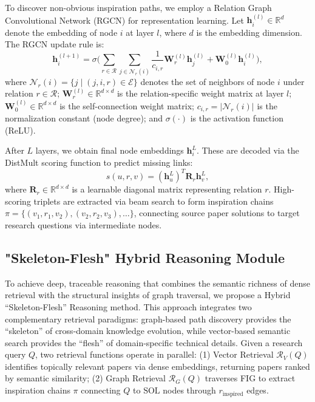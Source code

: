 \documentclass[runningheads]{llncs}
\begin{document}
To discover non-obvious inspiration paths, we employ a Relation Graph Convolutional Network (RGCN) for representation learning. Let $\mathbf{h}_i^{(l)} \in \mathbb{R}^d$ denote the embedding of node $i$ at layer $l$, where $d$ is the embedding dimension. The RGCN update rule is:
\begin{equation}
    \mathbf{h}_i^{(l+1)} = \sigma \Bigg( \sum_{r \in \mathcal{R}} \sum_{j \in \mathcal{N}_r(i)} \frac{1}{c_{i,r}} \mathbf{W}_r^{(l)} \mathbf{h}_j^{(l)} + \mathbf{W}_0^{(l)} \mathbf{h}_i^{(l)} \Bigg),
\end{equation}
where $\mathcal{N}_r(i) = \{j \mid (j, i, r) \in \mathcal{E}\}$ denotes the set of neighbors of node $i$ under relation $r \in \mathcal{R}$; $\mathbf{W}_r^{(l)} \in \mathbb{R}^{d \times d}$ is the relation-specific weight matrix at layer $l$; $\mathbf{W}_0^{(l)} \in \mathbb{R}^{d \times d}$ is the self-connection weight matrix; $c_{i,r} = |\mathcal{N}_r(i)|$ is the normalization constant (node degree); and $\sigma(\cdot)$ is the activation function (ReLU).

After $L$ layers, we obtain final node embeddings $\mathbf{h}_i^L$. These are decoded via the DistMult scoring function to predict missing links:
\begin{equation}
    s(u, r, v) = (\mathbf{h}_u^L)^T \mathbf{R}_r \mathbf{h}_v^L,
\end{equation}
where $\mathbf{R}_r \in \mathbb{R}^{d \times d}$ is a learnable diagonal matrix representing relation $r$. High-scoring triplets are extracted via beam search to form inspiration chains $\pi = \{(v_1, r_1, v_2), (v_2, r_2, v_3), \ldots\}$, connecting source paper solutions to target research questions via intermediate nodes.

\subsection{"Skeleton-Flesh" Hybrid Reasoning Module}
\label{sec:hybrid_reasoning}

To achieve deep, traceable reasoning that combines the semantic richness of dense retrieval with the structural insights of graph traversal, we propose a Hybrid ``Skeleton-Flesh'' Reasoning method. This approach integrates two complementary retrieval paradigms: graph-based path discovery provides the ``skeleton'' of cross-domain knowledge evolution, while vector-based semantic search provides the ``flesh'' of domain-specific technical details. Given a research query $Q$, two retrieval functions operate in parallel: (1) Vector Retrieval $\mathcal{R}_V(Q)$ identifies topically relevant papers via dense embeddings, returning papers ranked by semantic similarity; (2) Graph Retrieval $\mathcal{R}_G(Q)$ traverses FIG to extract inspiration chains $\pi$ connecting $Q$ to $\text{SOL}$ nodes through $r_{\text{inspired}}$ edges.
\end{document}
